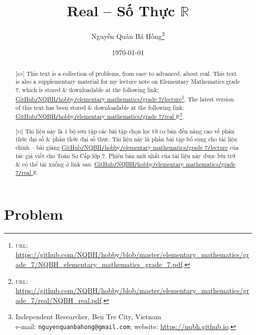 \documentclass{article}
\title{Real -- Số Thực $\mathbb{R}$}
\author{Nguyễn Quản Bá Hồng\footnote{Independent Researcher, Ben Tre City, Vietnam\\e-mail: \texttt{nguyenquanbahong@gmail.com}; website: \url{https://nqbh.github.io}.}}
\date{\today}
\numberwithin{equation}{section}
\begin{document}
\maketitle
\begin{abstract}
	\textsc{[en]} This text is a collection of problems, from easy to advanced, about real. This text is also a supplementary material for my lecture note on Elementary Mathematics grade 7, which is stored \& downloadable at the following link: \href{https://github.com/NQBH/hobby/blob/master/elementary_mathematics/grade_7/NQBH_elementary_mathematics_grade_7.pdf}{GitHub\texttt{/}NQBH\texttt{/}hobby\texttt{/}elementary mathematics\texttt{/}grade 7\texttt{/}lecture}\footnote{\textsc{url}: \url{https://github.com/NQBH/hobby/blob/master/elementary_mathematics/grade_7/NQBH_elementary_mathematics_grade_7.pdf}.}. The latest version of this text has been stored \& downloadable at the following link: \href{https://github.com/NQBH/hobby/blob/master/elementary_mathematics/grade_7/real/NQBH_real.pdf}{GitHub\texttt{/}NQBH\texttt{/}hobby\texttt{/}elementary mathematics\texttt{/}grade 7\texttt{/}real $\mathbb{R}$}\footnote{\textsc{url}: \url{https://github.com/NQBH/hobby/blob/master/elementary_mathematics/grade_7/real/NQBH_real.pdf}.}.
	\vspace{2mm}
	
	\textsc{[vi]} Tài liệu này là 1 bộ sưu tập các bài tập chọn lọc từ cơ bản đến nâng cao về phân thức đại số \& phân thức đại số thực. Tài liệu này là phần bài tập bổ sung cho tài liệu chính -- bài giảng \href{https://github.com/NQBH/hobby/blob/master/elementary_mathematics/grade_7/NQBH_elementary_mathematics_grade_7.pdf}{GitHub\texttt{/}NQBH\texttt{/}hobby\texttt{/}elementary mathematics\texttt{/}grade 7\texttt{/}lecture} của tác giả viết cho Toán Sơ Cấp lớp 7. Phiên bản mới nhất của tài liệu này được lưu trữ \& có thể tải xuống ở link sau: \href{https://github.com/NQBH/hobby/blob/master/elementary_mathematics/grade_7/real/NQBH_real.pdf}{GitHub\texttt{/}NQBH\texttt{/}hobby\texttt{/}elementary mathematics\texttt{/}grade 7\texttt{/}real $\mathbb{R}$}.
\end{abstract}
\setcounter{secnumdepth}{4}
\setcounter{tocdepth}{3}
\tableofcontents


\section{Problem}
\end{document}

